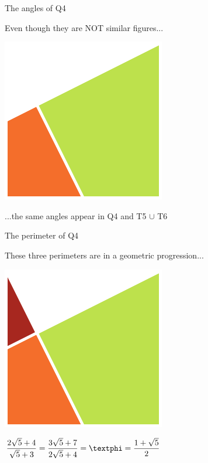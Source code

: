 \documentclass[14pt]{beamer}
\begin{document}

    \begin{frame}{The angles of Q4}
        \begin{center}
            Even though they are NOT similar figures...
        \end{center}
        \hspace{6.18em} \includegraphics[scale=1.0]{figures/figure001g.pdf} \\
        \begin{center}
            ...the same angles appear in Q4 and T5 $\cup$ T6
        \end{center}
    \end{frame}


    \begin{frame}{The perimeter of Q4}
        \begin{center}
            These three perimeters are in a geometric progression...
        \end{center}
        \hspace{6.18em} \includegraphics[scale=1.0]{figures/figure001h.pdf} \\
        \begin{center}
            \vspace{-1.3ex}%
            $\displaystyle\frac{2\sqrt{5} + 4}{\sqrt{5} + 3} = \frac{3\sqrt{5} + 7}{2\sqrt{5} + 4} = \text{\textphi} = \frac{1+\sqrt{5}}{2}$
            \vspace{-1.3ex}
        \end{center}
    \end{frame}
\end{document}
